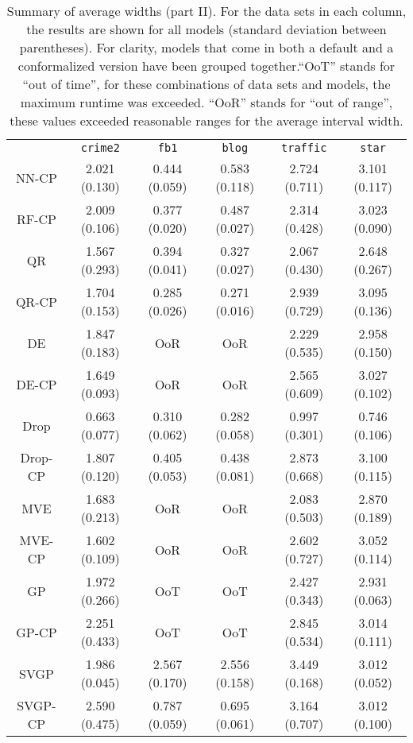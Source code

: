 \documentclass[smallcondensed]{svjour3}
\begin{document}
\begin{appendices}
    \begin{table}[ht!]
        \scriptsize
        \centering
        \renewcommand{\arraystretch}{1.5}
        \begin{tabular}{c||c|c|c|c|c}
            &\texttt{crime2}&\texttt{fb1}&\texttt{blog}&\texttt{traffic}&\texttt{star}\\
            \hhline{======}
            NN-CP&2.021 (0.130)&0.444 (0.059)&0.583 (0.118)&2.724 (0.711)&3.101 (0.117)\\
            \hdashline
            RF-CP&2.009 (0.106)&0.377 (0.020)&0.487 (0.027)&2.314 (0.428)&3.023 (0.090)\\
            \hdashline
            QR&1.567 (0.293)&0.394 (0.041)&0.327 (0.027)&2.067 (0.430)&2.648 (0.267)\\
            QR-CP&1.704 (0.153)&0.285 (0.026)&0.271 (0.016)&2.939 (0.729)&3.095 (0.136)\\
            \hdashline
            DE&1.847 (0.183)&OoR&OoR&2.229 (0.535)&2.958 (0.150)\\
            DE-CP&1.649 (0.093)&OoR&OoR&2.565 (0.609)&3.027 (0.102)\\
            \hdashline
            Drop&0.663 (0.077)&0.310 (0.062)&0.282 (0.058)&0.997 (0.301)&0.746 (0.106)\\
            Drop-CP&1.807 (0.120)&0.405 (0.053)&0.438 (0.081)&2.873 (0.668)&3.100 (0.115)\\
            \hdashline
            MVE&1.683 (0.213)&OoR&OoR&2.083 (0.503)&2.870 (0.189)\\
            MVE-CP&1.602 (0.109)&OoR&OoR&2.602 (0.727)&3.052 (0.114)\\
            \hdashline
            GP&1.972 (0.266)&OoT&OoT&2.427 (0.343)&2.931 (0.063)\\
            GP-CP&2.251 (0.433)&OoT&OoT&2.845 (0.534)&3.014 (0.111)\\
            \hdashline
            SVGP&1.986 (0.045)&2.567 (0.170)&2.556 (0.158)&3.449 (0.168)&3.012 (0.052)\\
            SVGP-CP&2.590 (0.475)&0.787 (0.059)&0.695 (0.061)&3.164 (0.707)&3.012 (0.100)\\
        \end{tabular}
        \caption{Summary of average widths (part II). For the data sets in each column, the results are shown for all models (standard deviation between parentheses). For clarity, models that come in both a default and a conformalized version have been grouped together.``OoT'' stands for ``out of time'', for these combinations of data sets and models, the maximum runtime was exceeded. ``OoR'' stands for ``out of range'', these values exceeded reasonable ranges for the average interval width. }
        \label{table:width2}
    \end{table}

\end{appendices}
\end{document}
